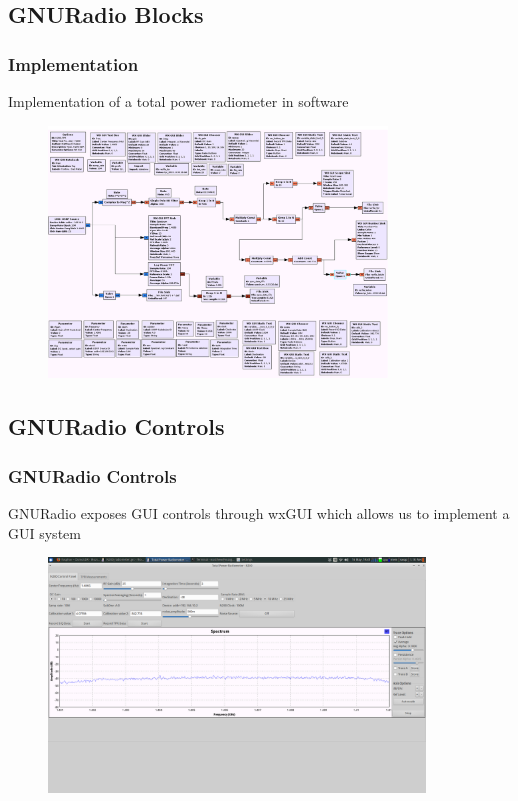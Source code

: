 \documentclass[notes]{beamer}
\begin{document}
\subsection{GNURadio Blocks}
\begin{frame}
\frametitle{Implementation}

Implementation of a total power radiometer in software 

\begin{figure}\label{GNURadio_Block}
\includegraphics[width=9cm]{images/GNURadio_Block_tpr.png}
\end{figure}

\end{frame}

\subsection{GNURadio Controls}
\begin{frame}
\frametitle{GNURadio Controls}
GNURadio exposes GUI controls through wxGUI which allows us to implement a GUI system
\begin{figure}\label{GNURadio_GUI}
\includegraphics[width=10cm]{images/radiometer_gui.png}
\end{figure}

\end{frame}
\end{document}
